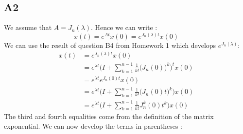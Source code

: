 \documentclass[11pt]{article}
\begin{document}
\subsection*{A2}
We assume that $A=J_n(\lambda)$. Hence we can write :
\begin{equation*}
    x(t)=e^{At}x(0)=e^{J_n(\lambda)t}x(0)
\end{equation*}
We can use the result of question B4 from Homework 1 which develops $e^{J_n(\lambda)}$:
\begin{align*}
    x(t)&=e^{J_n(\lambda)t}x(0)\\
    &=e^{\lambda t}\Bigg(I+\sum_{k=1}^{n-1}\frac{1}{k!}\big(J_n(0)\big)^k\Bigg)^t x(0)\\
    &=e^{\lambda t}e^{J_n(0) t} x(0)\\
    &=e^{\lambda t}\Bigg(I+\sum_{k=1}^{n-1}\frac{1}{k!}\big(J_n(0) t\big)^k\Bigg) x(0)\\
    &=e^{\lambda t}\Bigg(I+\sum_{k=1}^{n-1}\frac{1}{k!}J_n^k(0) t^k\Bigg) x(0)
\end{align*}
The third and fourth equalities come from the definition of the matrix exponential. We can now develop the terms in parentheses : 
\end{document}
